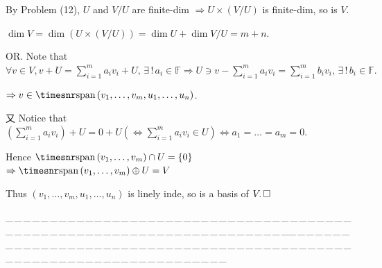 \documentclass[a4paper, 11pt, UTF8]{article}
\def\Spn{{\timesnr\textup{span}}\,}
\def\Fbb{{\mathbb{F}}}
\def\Or{\large O{\footnotesize R.} }
\def\ProblemEnding{{\tiny \_\,\_\,\_\,\_\,\_\,\_\,\_\,\_\,\_\,\_\,\_\,\_\,\_\,\_\,\_\,\_\,\_\,\_\,\_\,\_\,\_\,\_\,\_\,\_\,\_\,\_\,\_\,\_\,\_\,\_\,\_\,\_\,\_\,\_\,\_\,\_\,\_\,\_\,\_\,\_\,\_\,\_\,\_\,\_\,\_\,\_\,\_\,\_\,\_\,\_\,\_\,\_\,\_\,\_\,\_\,\_\,\_\,\_\,\_\,\_\,\_\,\_\,\_\,\_\,\_\,\_\,\_\,\_\,\_\,\_\,\_\_\,\_\,\_\,\_\,\_\,\_\,\_\,\_\,\_\,\_\,\_\,\_\,\_\,\_\,\_\,\_\,\_\,\_\,\_\,\_\,\_\,\_\,\_\,\_\,\_\,\_\,\_\,\_\,\_\,\_\,\_\,\_\,\_\,\_\,\_\,\_\,\_\,\_\,\_\,\_\,\_\,\_\,\_\,\_\,\_\,\_\,\_\,\_\,\_\,\_\,\_\,\_\,\_\,\_\,\_\,\_\,\_\,\_\,\_\,\_\,\_\,\_\,\_\,\_\,\_\,\_\,\_\,\_\,\_\,\_\,\_}}
\begin{document}
\begin{large}
\par\quad
By Problem (12), $U$ and $V/U$ are finite-dim $\Rightarrow U\times(V/U)$ is finite-dim, so is $V$.\par\quad
$\dim V=\dim\left(U\times(V/U)\right)=\dim U+\dim V/U=m+n.$\par\quad
\Or Note that $\forall v\in V,v+U=\sum\limits_{i=1}^m a_i v_i+U,\,\exists\,!\,a_i\in\Fbb\Rightarrow U\ni v-\sum\limits_{i=1}^m a_i v_i=\sum\limits_{i=1}^m b_i v_i,\,\exists\,!\,b_i\in\Fbb.$\par\quad\qquad\qquad\qquad\!\!\!
$\Rightarrow v\in\Spn(v_1,\dots,v_m,u_1,\dots,u_n)$.\par\quad
又 Notice that $(\sum\limits_{i=1}^m a_i v_i)+U=0+U(\Longleftrightarrow\sum\limits_{i=1}^m a_i v_i\in U)\Longleftrightarrow a_1=\dots=a_m=0.$\par\quad
Hence $\Spn(v_1,\dots,v_m)\cap U=\{0\}$
$\Rightarrow\Spn(v_1,\dots,v_m)\oplus U=V$\par\quad
Thus $(v_1,\dots,v_m,u_1,\dots,u_n)$ is linely inde, so is a basis of $V.\,\hfill\square$\par
\ProblemEnding\par


\end{large}
\end{document}
